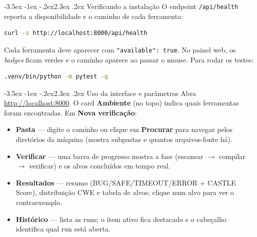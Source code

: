 \documentclass[11pt,a4paper]{article}
\makeatletter
\renewcommand\section{\@startsection{section}{1}{0pt}%
  {-3.5ex \@plus -1ex \@minus -.2ex}{2.3ex \@plus.2ex}%
  {\normalfont\Large\bfseries\color{azulesc}}}
\makeatother
\begin{document}
\section{Verificando a instala\c{c}\~ao}
O endpoint \texttt{/api/health} reporta a disponibilidade e o caminho de cada
ferramenta:
\begin{lstlisting}[language=bash]
curl -s http://localhost:8000/api/health
\end{lstlisting}
Cada ferramenta deve aparecer com \texttt{"available": true}. No painel web, os
\emph{badges} ficam verdes e o caminho aparece ao passar o mouse. Para rodar os testes:
\begin{lstlisting}[language=bash]
.venv/bin/python -m pytest -q
\end{lstlisting}

\section{Uso da interface e par\^ametros}
Abra \url{http://localhost:8000}. O card \textbf{Ambiente} (no topo) indica quais
ferramentas foram encontradas. Em \textbf{Nova verifica\c{c}\~ao}:
\begin{itemize}
  \item \textbf{Pasta} --- digite o caminho ou clique em \textbf{Procurar} para navegar
        pelos diret\'orios da m\'aquina (mostra subpastas e quantos arquivos-fonte h\'a).
  \item \textbf{Verificar} --- uma barra de progresso mostra a fase (escanear $\to$
        compilar $\to$ verificar) e os alvos conclu\'idos em tempo real.
  \item \textbf{Resultados} --- resumo (BUG/SAFE/TIMEOUT/ERROR + CASTLE Score),
        distribui\c{c}\~ao CWE e tabela de alvos; clique num alvo para ver o contraexemplo.
  \item \textbf{Hist\'orico} --- lista as runs; o item ativo fica destacado e o cabe\c{c}alho
        identifica qual run est\'a aberta.
\end{itemize}
\end{document}
